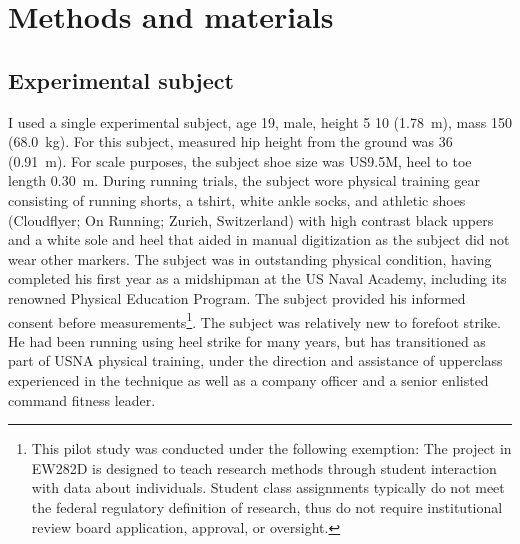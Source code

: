 \section{Methods and materials}
\label{sec:methods}

\subsection{Experimental subject}
I used a single experimental subject, age \SI{19}{\year}, male, height \SI{5}{\foot} \SI{10}{\inch} (\SI{1.78}{\meter}), mass \SI{150}{\pound} (\SI{68.0}{\kilo\gram}). For this subject, measured hip height from the ground was \SI{36}{\inch} (\SI{0.91}{\meter}). For scale purposes, the subject shoe size was US9.5M, heel to toe length \SI{0.30}{\meter}. During running trials, the subject wore physical training gear consisting of running shorts, a tshirt, white ankle socks, and athletic shoes (Cloudflyer; On Running; Zurich, Switzerland) with high contrast black uppers and a white sole and heel that aided in manual digitization as the subject did not wear other markers. The subject was in outstanding physical condition, having completed his first year as a midshipman at the US Naval Academy, including its renowned Physical Education Program. The subject provided his informed consent before measurements\footnote{This pilot study was conducted under the following exemption: The project in EW282D is designed to teach research methods through student interaction with data about individuals. Student class assignments typically do not meet the federal regulatory definition of research, thus do not require institutional review board application, approval, or oversight.}.  The subject was relatively new to forefoot strike. He had been running using heel strike for many years, but has transitioned as part of USNA physical training, under the direction and assistance of upperclass experienced in the technique as well as a company officer and a senior enlisted command fitness leader. 


